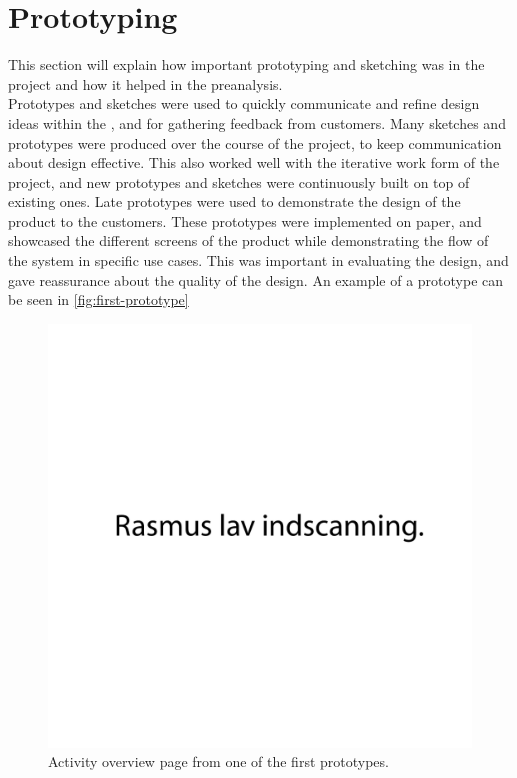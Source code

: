 \section{Prototyping}
This section will explain how important prototyping and sketching was in the project and how it helped in the preanalysis. \\

Prototypes and sketches were used to quickly communicate and refine design ideas within the \localgroup{}, and for gathering feedback from customers. 
Many sketches and prototypes were produced over the course of the project, to keep communication about design effective. 
This also worked well with the iterative work form of the project, and new prototypes and sketches were continuously built on top of existing ones. \newline
Late prototypes were used to demonstrate the design of the product to the customers. 
These prototypes were implemented on paper, and showcased the different screens of the product while demonstrating the flow  of the system in specific use cases. 
This was important in evaluating the design, and gave reassurance about the quality of the design. \newline
An example of a prototype can be seen in \autoref{fig:first-prototype}

\begin{figure}[h!]
	\centering
	\includegraphics[scale=0.5]{gfx/first-prototype.pdf}
	\caption{Activity overview page from one of the first prototypes.}
	\label{fig:first-prototype}
\end{figure}